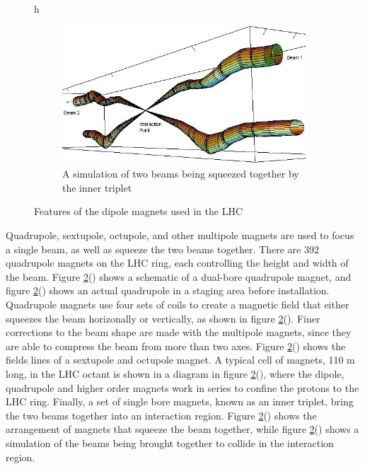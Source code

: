 \begin{figure}{h}
      \begin{subfigure}[h]{0.450\textwidth}
        \includegraphics[width=\textwidth]{Figures/LHC_Diagrams/LHC_InteractionRegion.jpg}
        \caption{A simulation of two beams being squeezed together by
          the inner triplet \cite{LHC:LHC_lhc_IR_schematic_image}}\label{fig:lhc_beam_squeeze}
      \end{subfigure}
       \caption{Features of the dipole magnets used in the LHC}\label{fig:lhc_multipole}
\end{figure}


\par Quadrupole, sextupole, octupole, and other multipole magnets are
used to focus a single beam, as well as squeeze the two beams
together.  There are 392 quadrupole magnets
on the LHC ring, each controlling the height and width of the beam.
Figure \ref{fig:lhc_multipole}() shows a
schematic of a dual-bore quadrupole magnet, and figure
\ref{fig:lhc_multipole}() shows an
actual quadrupole in a staging area before  installation.  Quadrupole
magnets use four sets of coils to create a magnetic field that either
squeezes the beam horizonally or vertically, as shown in figure
\ref{fig:lhc_multipole}(). Finer
corrections to the beam shape are made with the multipole magnets,
since they are able to compress the beam from more than two axes.
Figure \ref{fig:lhc_multipole}()
shows the fields lines of a sextupole and  octupole magnet.  A typical
cell of magnets, 110 m long, in the LHC octant is shown in a diagram
in figure \ref{fig:lhc_multipole}(), where the dipole, 
quadrupole and higher order magnets work in series to confine the
protons to the LHC ring.  Finally, a set of single bore magnets, known
as an inner triplet, bring the two beams together into an interaction
region.  Figure
\ref{fig:lhc_multipole}() shows the
arrangement of magnets that squeeze the beam together, while figure
\ref{fig:lhc_multipole}() shows a
simulation of the beams being brought together to collide in the
interaction region.  


